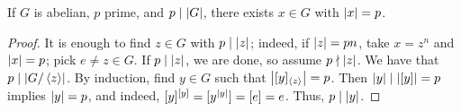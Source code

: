 \begin{lemma}
    If $G$ is abelian, $p$ prime, and $p \mid \left\lvert G \right\rvert$, there exists $x \in G$ with $\left\lvert x \right\rvert = p$.
\end{lemma}
\begin{proof}
    It is enough to find $z \in G$ with $p \mid \left\lvert z \right\rvert$; indeed, if $\left\lvert z \right\rvert = pn$, take $x = z^n$ and $\left\lvert x \right\rvert = p$; pick $e \neq z \in G$. If $p \mid \left\lvert z \right\rvert$, we are done, so assume $p \nmid \left\lvert z \right\rvert$. We have that $p \mid \left\lvert G/\left<z\right> \right\rvert$. By induction, find $y \in G$ such that $\left\lvert [y]_{\left<z\right>} \right\rvert = p$. Then $\left\lvert y \right\rvert \mid \left\lvert [y] \right\rvert = p$ implies $\left\lvert y \right\rvert = p$, and indeed, $[y]^{[y]} = [y^{\left\lvert y \right\rvert}] = [e] = e$. Thus, $p \mid \left\lvert y \right\rvert$.
\end{proof}